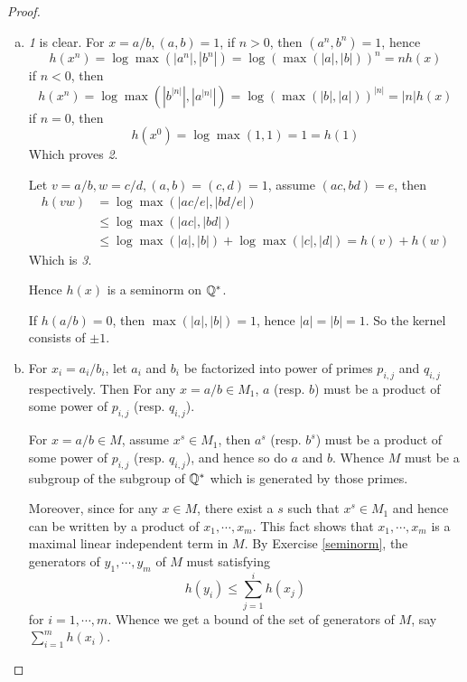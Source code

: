   \begin{proof}
    \begin{enumerate}[a)]
      \item \emph{1} is clear. For $x=a/b,(a,b)=1$, if $n>0$, then $(a^n,b^n)=1$, hence
               \begin{equation*}
                  h(x^n)=\log\max(|a^n|,|b^n|)=\log(\max(|a|,|b|))^n=nh(x)
               \end{equation*}
               if $n<0$, then
               \begin{equation*}
                  h(x^n)=\log\max(|b^{|n|}|,|a^{|n|}|)=\log(\max(|b|,|a|))^{|n|}=|n|h(x)
               \end{equation*}
               if $n=0$, then
               \begin{equation*}
                 h(x^0)=\log\max(1,1)=1=h(1)
               \end{equation*}
               Which proves \emph{2}.

               Let $v=a/b,w=c/d,(a,b)=(c,d)=1$, assume $(ac,bd)=e$, then
               \begin{align*}
                 h(vw) &=\log\max(|ac/e|,|bd/e|)\\
                          &\leqslant\log\max(|ac|,|bd|)\\
                          &\leqslant\log\max(|a|,|b|)+\log\max(|c|,|d|)=h(v)+h(w)
               \end{align*}
               Which is \emph{3}.

               Hence $h(x)$ is a seminorm on ${\mathbb Q}^{\ast}$.

               If $h(a/b)=0$, then $\max(|a|,|b|)=1$, hence $|a|=|b|=1$. So the kernel consists of $\pm1$.
     \item For $x_i=a_i/b_i$, let $a_i$ and $b_i$ be factorized into power of primes $p_{i,j}$ and $q_{i,j}$ respectively.
              Then For any $x=a/b\in M_1$, $a$ (resp. $b$) must be a product of some power of $p_{i,j}$ (resp. $q_{i,j}$).

              For $x=a/b\in M$, assume $x^s\in M_1$, then $a^s$ (resp. $b^s$) must be a product of some power of $p_{i,j}$ (resp. $q_{i,j}$),
              and hence so do $a$ and $b$. Whence $M$ must be a subgroup of the subgroup of ${\mathbb Q}^{\ast}$ which is generated by those primes.

              Moreover, since for any $x\in M$, there exist a $s$ such that $x^s\in M_1$ and hence can be written by a product of $x_1,\cdots,x_m$. This fact shows that $x_1,\cdots,x_m$ is a maximal linear independent term in $M$.
              By Exercise \ref{seminorm}, the generators of $y_1,\cdots,y_m$ of $M$ must satisfying
              \begin{equation*}
                h(y_i)\leqslant\sum_{j=1}^ih(x_j)
              \end{equation*}
              for $i=1,\cdots,m$. Whence we get a bound of the set of generators of $M$, say $\sum\limits_{i=1}^m h(x_i)$.
    \end{enumerate}
  \end{proof}

